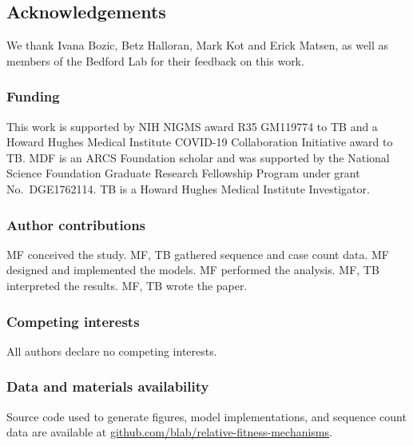 \documentclass[12pt,oneside,letterpaper]{article}
\begin{document}
\subsection*{Acknowledgements}

We thank Ivana Bozic, Betz Halloran, Mark Kot and Erick Matsen, as well as members of the Bedford Lab for their feedback on this work.

\subsubsection*{Funding}

This work is supported by NIH NIGMS award R35 GM119774 to TB and a Howard Hughes Medical Institute COVID-19 Collaboration Initiative award to TB.
MDF is an ARCS Foundation scholar and was supported by the National Science Foundation Graduate Research Fellowship Program under grant No.\ DGE1762114.
TB is a Howard Hughes Medical Institute Investigator.

\subsubsection*{Author contributions}
MF conceived the study.
MF, TB gathered sequence and case count data.
MF designed and implemented the models.
MF performed the analysis.
MF, TB interpreted the results.
MF, TB wrote the paper.

\subsubsection*{Competing interests}

All authors declare no competing interests.

\subsubsection*{Data and materials availability}

Source code used to generate figures, model implementations, and sequence count data are available at \href{https://github.com/blab/relative-fitness-mechanisms}{github.com/blab/relative-fitness-mechanisms}.




\newpage

\appendix

\setcounter{figure}{0}
\setcounter{table}{0}
\setcounter{page}{1}
\renewcommand{\thefigure}{S\arabic{figure}}
\renewcommand{\thetable}{S\arabic{table}}
\renewcommand{\thepage}{S\arabic{page}}
\renewcommand{\thesubsection}{S\arabic{subsection}}
\end{document}
